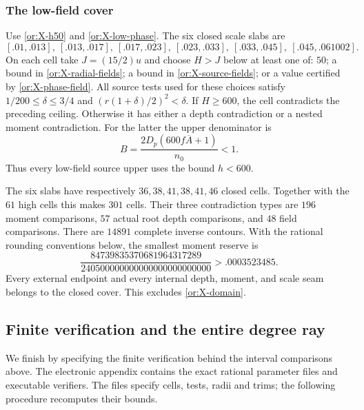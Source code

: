 \documentclass[11pt,reqno]{amsart}
\numberwithin{equation}{section}
\theoremstyle{definition}
\theoremstyle{remark}
\begin{document}
\subsubsection{The low-field cover}

Use \eqref{or:X-h50} and \eqref{or:X-low-phase}.
The six closed scale slabs are
\begin{equation}\label{or:X-slabs}
 [.01,.013],\ [.013,.017],\ [.017,.023],\ [.023,.033],\
 [.033,.045],\ [.045,.061002].
\end{equation}
On each cell take $J=(15/2)u$ and choose $H>J$ below at least one
of: $50$; a bound in \eqref{or:X-radial-fields}; a bound in
\eqref{or:X-source-fields}; or a value certified by
\eqref{or:X-phase-field}.  All source tests used for these choices
satisfy $1/200\le\delta\le3/4$ and
$(r(1+\delta)/2)^2<\delta$.
If $H\ge600$, the cell contradicts the preceding ceiling.
Otherwise it has either a depth contradiction or a nested
moment contradiction.  For the latter the upper denominator is
\begin{equation}\label{or:X-low-denominator}
                   B=\frac{2D_p(600f\overline A+1)}{n_0}<1.
\end{equation}
Thus every low-field source upper uses the bound $h<600$.

The six slabs have respectively $36,38,41,38,41,46$ closed cells.
Together with the $61$ high cells this makes $301$ cells.  Their
three contradiction types are $196$ moment comparisons, $57$ actual
root depth comparisons, and $48$ field comparisons.  There are
$14891$ complete inverse contours.  With the rational rounding
conventions below, the smallest moment reserve is
\begin{equation}\label{or:X-reserve}
       \frac{84739835370681964317289}
            {240500000000000000000000000}>.0003523485.
\end{equation}
Every external endpoint and every internal depth, moment, and scale
seam belongs to the closed cover.  This excludes \eqref{or:X-domain}.

\subsection{Finite verification and the entire degree ray}
\label{or:finite-verification}

We finish by specifying the finite verification behind the interval
comparisons above.  The electronic appendix contains the exact
rational parameter files and executable verifiers.  The files specify
cells, tests, radii and trims; the following procedure recomputes
their bounds.
\end{document}
